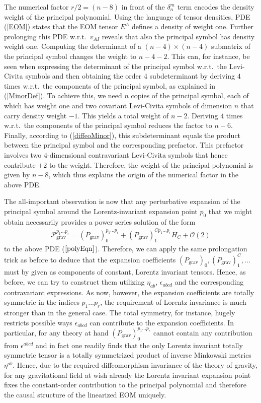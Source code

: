 The numerical factor $r/2 = (n-8)$ in front of the $\delta^m_n$ term encodes the density weight of the principal polynomial. Using the language of tensor densities, PDE (\ref{EOM}) states that the EOM tensor $E^A$ defines a density of weight one. Further prolonging this PDE w.r.t.\ $v_{AI}$ reveals that also the principal symbol has density weight one. Computing the determinant of a $(n-4) \times (n-4)$ submatrix of the principal symbol changes the weight to $n-4-2$. This can, for instance, be seen when expressing the determinant of the principal symbol w.r.t.\ the Levi-Civita symbols and then obtaining the order $4$ subdeterminant by deriving $4$ times w.r.t.\ the components of the principal symbol, as explained in (\ref{MinorDef}). To achieve this, we need $n$ copies of the principal symbol, each of which has weight one and two covariant Levi-Civita symbols of dimension $n$ that carry density weight $-1$. This yields a total weight of $n-2$. Deriving $4$ times w.r.t.\ the components of the principal symbol reduces the factor to $n-6$. Finally, according to (\ref{diffeoMinor}), this subdeterminant equals the product between the principal symbol and the corresponding prefactor. This prefactor involves two $4$-dimensional contravariant Levi-Civita symbols that hence contribute $+2$ to the weight. Therefore, the weight of the principal polynomial is given by $n-8$, which thus explains the origin of the numerical factor in the above PDE. 

The all-important observation is now that any perturbative expansion of the principal symbol around the Lorentz-invariant expansion point $p_0$ that we might obtain necessarily provides a power series solution of the form
\begin{align}
    \mathcal{P}_{\text{grav}}^{{p_1}...{p_{r}}} = (P_{\text{grav}})^{{p_1}...{p_{r}}}_0 + (P_{\text{grav}})_1^{C{p_1}...{p_{r}}} H_C + \mathcal{O}(2)
\end{align}
to the above PDE ($\ref{polyEqn}$). Therefore, we can apply the same prolongation trick as before to deduce that the expansion coefficients $(P_{\text{grav}})_0, (P_{\text{grav}})_1^C,...$ must by given as components of constant, Lorentz invariant tensors. Hence, as before, we can try to construct them utilizing $\eta_{ab}$, $\epsilon_{abcd}$ and the corresponding contravariant expressions. As now, however, the expansion coefficients are totally symmetric in the indices $p_1...p_r$, the requirement of Lorentz invariance is much stronger than in the general case. The total symmetry, for instance, hugely restricts possible ways $\epsilon_{abcd}$ can contribute to the expansion coefficients. In particular, for any theory at hand $(P_{\text{grav}})_0^{{p_1}...{p_{r}}}$ cannot contain any contribution from $\epsilon^{abcd}$ and in fact one readily finds that the only Lorentz invariant totally symmetric tensor is a totally symmetrized product of inverse Minkowski metrics $\eta^{ab}$. Hence, due to the required diffeomorphism invariance of the theory of gravity, for any gravitational field at wish already the Lorentz invariant expansion point fixes the constant-order contribution to the principal polynomial and therefore the causal structure of the linearized EOM uniquely.

